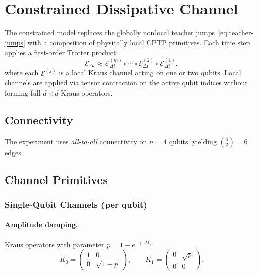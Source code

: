 \documentclass[11pt,a4paper]{article}
\begin{document}
\section{Constrained Dissipative Channel}

The constrained model replaces the globally nonlocal teacher
jumps~\eqref{eq:teacher-jumps} with a composition of physically
local CPTP primitives.  Each time step applies a first-order Trotter
product:
\begin{equation}\label{eq:trotter}
  \mathcal{E}_{\Delta t}
  \approx
  \mathcal{E}^{(m)}_{\Delta t}
  \circ \cdots \circ
  \mathcal{E}^{(2)}_{\Delta t}
  \circ \mathcal{E}^{(1)}_{\Delta t},
\end{equation}
where each $\mathcal{E}^{(j)}$ is a local Kraus channel acting on
one or two qubits.  Local channels are applied via tensor contraction
on the active qubit indices without forming full $d\times d$ Kraus
operators.

\subsection{Connectivity}

The experiment uses \emph{all-to-all} connectivity on $n=4$ qubits,
yielding $\binom{4}{2}=6$ edges.

\subsection{Channel Primitives}

\subsubsection{Single-Qubit Channels (per qubit)}

\paragraph{Amplitude damping.}
Kraus operators with parameter $p = 1-e^{-\gamma_i\,\Delta t}$:
\begin{equation}
  K_0 = \begin{pmatrix} 1 & 0 \\ 0 & \sqrt{1-p}\end{pmatrix},
  \qquad
  K_1 = \begin{pmatrix} 0 & \sqrt{p} \\ 0 & 0\end{pmatrix}.
\end{equation}
\end{document}
